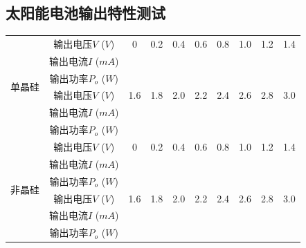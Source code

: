 \documentclass{ctexart}
\begin{document}
\newpage

\subsection{太阳能电池输出特性测试}

\begin{table}[!htbp]
    \centering
    \renewcommand{\arraystretch}{1.5} %
    \setlength{\tabcolsep}{10pt} %
    \begin{tabular}{|c|c|c|c|c|c|c|c|c|c|}
        \hline
        \multirow{6}{0.4cm}{单晶硅} & 输出电压$V$ ($V$) & 0 & 0.2 & 0.4 & 0.6 & 0.8 & 1.0 & 1.2 & 1.4 \\
        \cline{2-10}
         & 输出电流$I$ ($mA$) & & & & & & & & \\
        \cline{2-10}
         & 输出功率$P_o$ ($W$) & & & & & & & & \\
        \cline{2-10}
         & 输出电压$V$ ($V$) & 1.6 & 1.8 & 2.0 & 2.2 & 2.4 & 2.6 & 2.8 & 3.0 \\
        \cline{2-10}
         & 输出电流$I$ ($mA$) & & & & & & & & \\
        \cline{2-10}
         & 输出功率$P_o$ ($W$) & & & & & & & & \\
        \hline
        \multirow{6}{0.4cm}{非晶硅} & 输出电压$V$ ($V$) & 0 & 0.2 & 0.4 & 0.6 & 0.8 & 1.0 & 1.2 & 1.4 \\
        \cline{2-10}
         & 输出电流$I$ ($mA$) & & & & & & & & \\
        \cline{2-10}
         & 输出功率$P_o$ ($W$) & & & & & & & & \\
        \cline{2-10}
         & 输出电压$V$ ($V$) & 1.6 & 1.8 & 2.0 & 2.2 & 2.4 & 2.6 & 2.8 & 3.0 \\
        \cline{2-10}
         & 输出电流$I$ ($mA$) & & & & & & & & \\
        \cline{2-10}
         & 输出功率$P_o$ ($W$) & & & & & & & & \\
        \hline
    \end{tabular}
\end{table}

\end{document}
